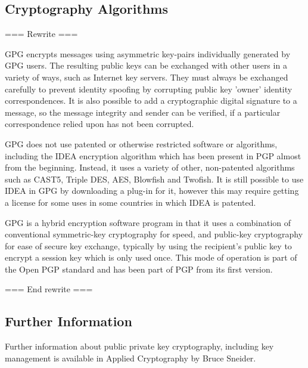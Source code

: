 \pagebreak

\subsection{Cryptography Algorithms}

=== Rewrite ===


GPG encrypts messages using asymmetric key-pairs individually generated
by GPG users. The resulting public keys can be exchanged with other
users in a variety of ways, such as Internet key servers. They must
always be exchanged carefully to prevent identity spoofing by
corrupting public key 'owner' identity correspondences. It is
also possible to add a cryptographic digital signature to a message, so
the message integrity and sender can be verified, if a particular
correspondence relied upon has not been corrupted.

GPG does not use patented or otherwise restricted software or
algorithms, including the IDEA encryption algorithm which has been
present in PGP almost from the beginning. Instead, it uses a variety of
other, non-patented algorithms such as CAST5, Triple DES, AES, Blowfish
and Twofish. It is still possible to use IDEA in GPG by downloading a
plug-in for it, however this may require getting a license for some uses
in some countries in which IDEA is patented.

GPG is a hybrid encryption software program in that it uses a
combination of conventional symmetric-key cryptography for speed, and
public-key cryptography for ease of secure key exchange, typically by
using the recipient's public key to encrypt a session key which is only
used once. This mode of operation is part of the Open PGP standard and
has been part of PGP from its first version.

=== End rewrite ===

\subsection{Further Information}

Further information about public private key cryptography, including key
management is available in Applied Cryptography by Bruce Sneider.
